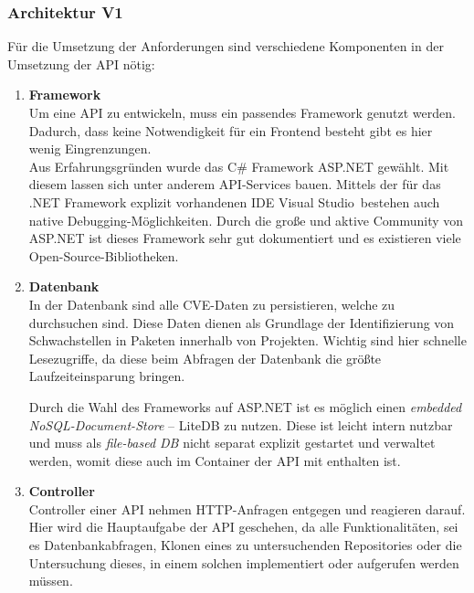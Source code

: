 \subsubsection{Architektur V1} \label{sec:ArchitekturV1}
    Für die Umsetzung der Anforderungen sind verschiedene Komponenten in der Umsetzung der \ac{API} nötig:
    \begin{enumerate}
        \item \textbf{Framework} \label{arch_1}\\
            Um eine \ac{API} zu entwickeln, muss ein passendes Framework genutzt werden.
            Dadurch, dass keine Notwendigkeit für ein Frontend besteht gibt es hier wenig Eingrenzungen.
            \\
            Aus Erfahrungsgründen wurde das C\# Framework ASP.NET gewählt.
            Mit diesem lassen sich unter anderem \ac{API}-Services bauen.
            Mittels der für das .NET Framework explizit vorhandenen IDE \glqq Visual Studio\grqq~bestehen auch native Debugging-Möglichkeiten.
            Durch die große und aktive Community von ASP.NET ist dieses Framework sehr gut dokumentiert und es existieren viele Open-Source-Bibliotheken.
        \item \textbf{Datenbank} \label{arch_2}\\
            In der Datenbank sind alle \ac{CVE}-Daten zu persistieren, welche zu durchsuchen sind.
            Diese Daten dienen als Grundlage der Identifizierung von Schwachstellen in Paketen innerhalb von Projekten.
            Wichtig sind hier schnelle Lesezugriffe, da diese beim Abfragen der Datenbank die größte Laufzeiteinsparung bringen.

            Durch die Wahl des Frameworks auf ASP.NET ist es möglich einen \textit{embedded NoSQL-Document-Store} -- LiteDB zu nutzen. %
            Diese ist leicht intern nutzbar und muss als \textit{file-based DB} nicht separat explizit gestartet und verwaltet werden, womit diese auch im Container der \ac{API} mit enthalten ist.
        \item \textbf{Controller} \label{arch_3}\\
            Controller einer \ac{API} nehmen HTTP-Anfragen entgegen und reagieren darauf.
            Hier wird die Hauptaufgabe der \ac{API} geschehen, da alle Funktionalitäten, sei es Datenbankabfragen, Klonen eines zu untersuchenden Repositories oder die Untersuchung dieses, in einem solchen implementiert oder aufgerufen werden müssen.


\end{enumerate}
